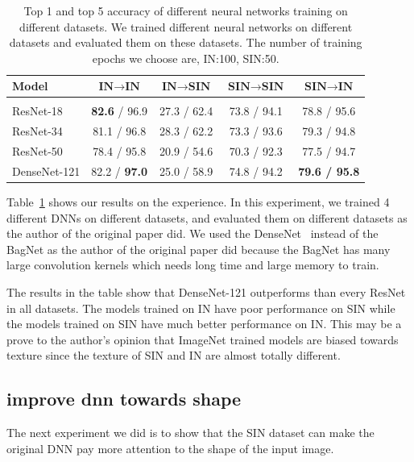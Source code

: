 \documentclass{article} %
\begin{document}
\begin{table}[!h]
\caption{Top 1 and top 5 accuracy of different neural networks training on different datasets. We trained different neural networks on different datasets and evaluated them on these datasets. The number of training epochs we choose are, IN:100, SIN:50.}
\label{sample-table}
\begin{center}
\begin{tabular}{l c c c c}
\bf Model & $\textbf{IN} \to \textbf{IN}$  & $\textbf{IN} \to \textbf{SIN}$  & $\textbf{SIN} \to \textbf{SIN}$  & $\textbf{SIN}\to\textbf{IN}$ \\
\hline \\  
ResNet-18    &{\bf82.6} / 96.9   &27.3 / 62.4  &73.8 / 94.1   &78.8 / 95.6\\
ResNet-34    &81.1 / 96.8   &28.3 / 62.2   &73.3 / 93.6    & 79.3 / 94.8\\
ResNet-50   &78.4 / 95.8   &20.9 / 54.6   &70.3 / 92.3   &77.5 / 94.7\\
DenseNet-121   & 82.2 / {\bf97.0}   &25.0 / 58.9   &74.8 / 94.2   &\bf79.6 / 95.8\\
\end{tabular}
\label{original}
\end{center}
\end{table}

Table~\ref{original} shows our results on the experience. In this experiment, we trained 4 different DNNs on different datasets, and evaluated them on different datasets as the author of the original paper did. We used the DenseNet~\cite{huang2017densely} instead of the BagNet as the author of the original paper did because the BagNet has many large convolution kernels which needs long time and large memory to train.

The results in the table show that DenseNet-121 outperforms than every ResNet in all datasets. The models trained on IN have poor performance on SIN while the models trained on SIN have much better performance on IN. This may be a prove to the author's opinion that ImageNet trained models are biased towards texture since the texture of SIN and IN are almost totally different.

\subsection{improve dnn towards shape}

The next experiment we did is to show that the SIN dataset can make the original DNN pay more attention to the shape of the input image.
\end{document}
